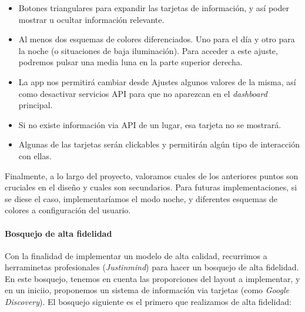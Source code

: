 \documentclass[../ei103948-project-documentation.tex]{subfiles}
\begin{document}
                                \begin{itemize}
                                    \item Botones triangulares para expandir las tarjetas de información, y así poder mostrar u ocultar información relevante.
                                    \item Al menos dos esquemas de colores diferenciados. Uno para el día y otro para la noche (o situaciones de baja iluminación). Para acceder a este ajuste, podremos pulsar una media luna en la parte superior derecha.
                                    \item La app nos permitirá cambiar desde Ajustes algunos valores de la misma, así como desactivar servicios API para que no aparezcan en el \textit{dashboard} principal.
                                    \item Si no existe información via API de un lugar, esa tarjeta no se mostrará.
                                    \item Algunas de las tarjetas serán clickables y permitirán algún tipo de interacción con ellas.
                                \end{itemize}

                                Finalmente, a lo largo del proyecto, valoramos cuales de los anteriores puntos son cruciales en el diseño y cuales son secundarios. Para futuras implementaciones, si se diese el caso, implementaríamos el modo noche, y diferentes esquemas de colores a configuración del usuario.


                                \paragraph{Bosquejo de alta fidelidad}
                                Con la finalidad de implementar un modelo de alta calidad, recurrimos a herraminetas profesionales (\textit{Justinmind}) para hacer un bosquejo de alta fidelidad. En este bosquejo, tenemos en cuenta las proporciones del layout a implementar, y en un iniciio, proponemos un sistema de información via tarjetas (como \textit{Google Discovery}). El bosquejo siguiente es el primero que realizamos de alta fidelidad:
\end{document}
